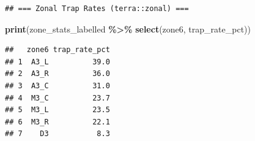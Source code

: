 \documentclass[
]{article}
\newenvironment{Shaded}{\begin{snugshade}}{\end{snugshade}}
\newcommand{\FunctionTok}[1]{\textcolor[rgb]{0.13,0.29,0.53}{\textbf{#1}}}
\newcommand{\NormalTok}[1]{#1}
\newcommand{\SpecialCharTok}[1]{\textcolor[rgb]{0.81,0.36,0.00}{\textbf{#1}}}
\begin{document}
\begin{verbatim}
## === Zonal Trap Rates (terra::zonal) ===
\end{verbatim}

\begin{Shaded}
\begin{Highlighting}[]
\FunctionTok{print}\NormalTok{(zone\_stats\_labelled }\SpecialCharTok{\%\textgreater{}\%} \FunctionTok{select}\NormalTok{(zone6, trap\_rate\_pct))}
\end{Highlighting}
\end{Shaded}

\begin{verbatim}
##   zone6 trap_rate_pct
## 1  A3_L          39.0
## 2  A3_R          36.0
## 3  A3_C          31.0
## 4  M3_C          23.7
## 5  M3_L          23.5
## 6  M3_R          22.1
## 7    D3           8.3
\end{verbatim}
\end{document}
